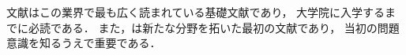 \documentclass[lualatex,ja=standard,magstyle=real,12pt]{bxjsarticle}
\begin{document}
文献\autocite{hoge2000,foobar1990}はこの業界で最も広く読まれている基礎文献であり，
大学院に入学するまでに必読である．
また，\autocite{hoge2001}は新たな分野を拓いた最初の文献であり，
当初の問題意識を知るうえで重要である．
\printbibliography
\end{document}
